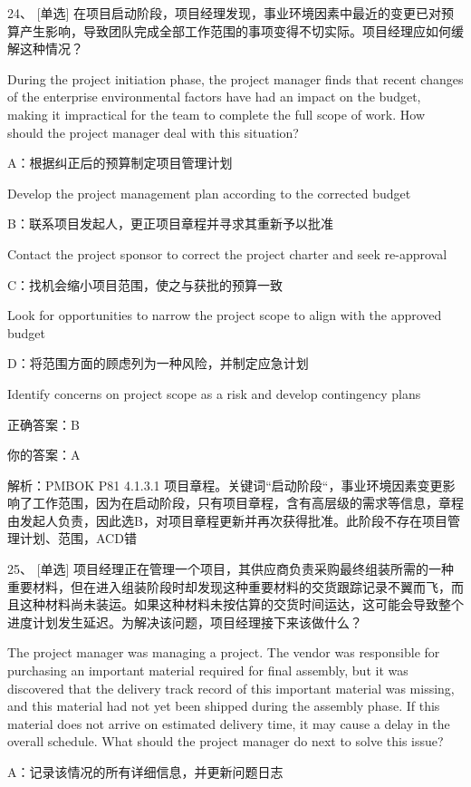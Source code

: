 24、 [单选] 在项目启动阶段，项目经理发现，事业环境因素中最近的变更已对预算产生影响，导致团队完成全部工作范围的事项变得不切实际。项目经理应如何缓解这种情况？

During the project initiation phase, the project manager finds that recent changes of the enterprise environmental factors have had an impact on the budget, making it impractical for the team to complete the full scope of work. How should the project manager deal with this situation?

A：根据纠正后的预算制定项目管理计划

Develop the project management plan according to the corrected budget

B：联系项目发起人，更正项目章程并寻求其重新予以批准

Contact the project sponsor to correct the project charter and seek re-approval

C：找机会缩小项目范围，使之与获批的预算一致

Look for opportunities to narrow the project scope to align with the approved budget

D：将范围方面的顾虑列为一种风险，并制定应急计划

Identify concerns on project scope as a risk and develop contingency plans

正确答案：B

你的答案：A

解析：PMBOK P81 4.1.3.1 项目章程。关键词“启动阶段“，事业环境因素变更影响了工作范围，因为在启动阶段，只有项目章程，含有高层级的需求等信息，章程由发起人负责，因此选B，对项目章程更新并再次获得批准。此阶段不存在项目管理计划、范围，ACD错

25、 [单选] 项目经理正在管理一个项目，其供应商负责采购最终组装所需的一种重要材料，但在进入组装阶段时却发现这种重要材料的交货跟踪记录不翼而飞，而且这种材料尚未装运。如果这种材料未按估算的交货时间运达，这可能会导致整个进度计划发生延迟。为解决该问题，项目经理接下来该做什么？

The project manager was managing a project. The vendor was responsible for purchasing an important material required for final assembly, but it was discovered that the delivery track record of this important material was missing, and this material had not yet been shipped during the assembly phase. If this material does not arrive on estimated delivery time, it may cause a delay in the overall schedule. What should the project manager do next to solve this issue?

A：记录该情况的所有详细信息，并更新问题日志

